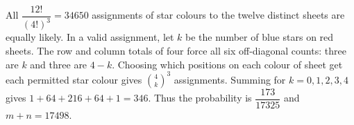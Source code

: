 All $\dfrac{12!}{(4!)^3}=34650$ assignments of star colours to the twelve distinct sheets are equally likely. In a valid assignment, let $k$ be the number of blue stars on red sheets. The row and column totals of four force all six off-diagonal counts: three are $k$ and three are $4-k$. Choosing which positions on each colour of sheet get each permitted star colour gives $\binom4k^3$ assignments. Summing for $k=0,1,2,3,4$ gives $1+64+216+64+1=346$. Thus the probability is $\dfrac{173}{17325}$ and $m+n=\boxed{17498}$.
